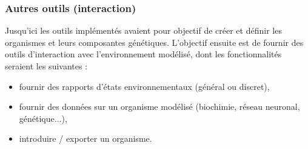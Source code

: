 \documentclass[11pt,twoside,a4paper]{article}
\begin{document}
\clearpage

\subsubsection{Autres outils (interaction)}

Jusqu'ici les outils impl{\'e}ment{\'e}s avaient pour objectif de cr{\'e}er et d{\'e}finir les organismes et leurs composantes g{\'e}n{\'e}tiques. L'objectif ensuite est de fournir des outils d'interaction avec l'environnement mod{\'e}lis{\'e}, dont les fonctionnalit{\'e}s seraient les suivantes : 
\begin{itemize}
	\item fournir des rapports d'{\'e}tats environnementaux (g{\'e}n{\'e}ral ou discret),
	\item fournir des donn{\'e}es sur un organisme mod{\'e}lis{\'e} (biochimie, r{\'e}seau neuronal, g{\'e}n{\'e}tique...), 
	\item introduire / exporter un organisme. 
\end{itemize}~\\
\end{document}
